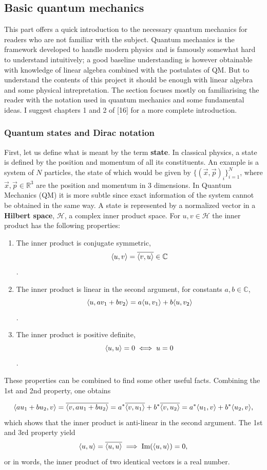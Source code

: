 \subsection{Basic quantum mechanics}
This part offers a quick introduction to the necessary quantum mechanics for readers who are not familiar with the subject. Quantum mechanics is the framework developed to handle modern physics and is famously somewhat hard to understand intuitively; 
a good baseline understanding is however obtainable with knowledge of linear algebra combined with the postulates of QM. But to understand the contents of this project it should be enough with linear algebra and some physical intrepretation. The section focuses mostly on familiarising the reader with the notation used in quantum mechanics and some fundamental ideas. I suggest chapters 1  and 2 of [16] for a more complete introduction.


\subsubsection{Quantum states and Dirac notation}
First, let us define what is meant by the term \textbf{state}. In classical physics, a state is defined by the position and momentum of all its constituents. An example is a system of $N$ particles, the state of which would be given by $\{ (\vec{x}, \vec{p})_i \}_{i=1}^N$, where $\vec{x},\vec{p} \in \mathbb{R}^3$ are the position and momentum in 3 dimensions. In Quantum Mechanics (QM) it is more subtle since exact information of the system cannot be obtained in the same way. A state is represented by a normalized vector in a \textbf{Hilbert space}, $\mathcal{H}$, a complex inner product space. For $u,v \in \mathcal{H}$ the inner product has the following properties:
\begin{enumerate}
\item  The inner product is conjugate symmetric, $$\langle u,v \rangle = \overline{\langle v,u \rangle} \in \mathbb{C}$$.
\item The inner product is linear in the second argument, for constants $a,b\in \mathbb{C}$, $$\langle u,av_1 + bv_2 \rangle = a\langle u,v_1 \rangle + b\langle u,v_2 \rangle$$.
\item The inner product is positive definite, $$\langle u,u \rangle = 0 \iff u = 0$$.
\end{enumerate}
These properties can be combined to find some other useful facts. Combining the 1st and 2nd property, one obtains

\begin{equation}
\langle au_1 + bu_2,v \rangle = \overline{\langle v,au_1 + bu_2 \rangle} = a^{*}\overline{\langle v,u_1 \rangle} + b^{*}\overline{\langle v,u_2 \rangle} =   a^{*}\langle u_1,v \rangle + b^{*}\langle u_2,v \rangle,
\end{equation} 
which shows that the inner product is anti-linear in the second argument. The 1st and 3rd property yield
\begin{equation}
\langle u,u \rangle = \overline{\langle u,u \rangle} \implies \text{Im}(\langle u,u \rangle) = 0,
\end{equation}
or in words, the inner product of two identical vectors is a real number.


